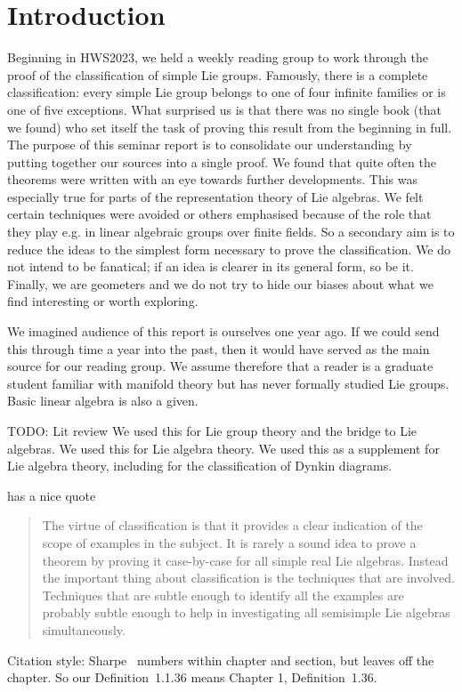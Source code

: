 \chapter{Introduction}

Beginning in HWS2023, we held a weekly reading group to work through the proof of the classification of simple Lie groups.
Famously, there is a complete classification: every simple Lie group belongs to one of four infinite families or is one of five exceptions.
What surprised us is that there was no single book (that we found) who set itself the task of proving this result from the beginning in full.
The purpose of this seminar report is to consolidate our understanding by putting together our sources into a single proof.
We found that quite often the theorems were written with an eye towards further developments.
This was especially true for parts of the representation theory of Lie algebras.
We felt certain techniques were avoided or others emphasised because of the role that they play e.g. in linear algebraic groups over finite fields.
So a secondary aim is to reduce the ideas to the simplest form necessary to prove the classification.
We do not intend to be fanatical; if an idea is clearer in its general form, so be it.
Finally, we are geometers and we do not try to hide our biases about what we find interesting or worth exploring.

We imagined audience of this report is ourselves one year ago.
If we could send this through time a year into the past, then it would have served as the main source for our reading group. 
We assume therefore that a reader is a graduate student familiar with manifold theory but has never formally studied Lie groups.
Basic linear algebra is also a given.

TODO: Lit review
\cite{Warner1983} We used this for Lie group theory and the bridge to Lie algebras.
\cite{Hall2015} We used this for Lie algebra theory.
\cite{Fulton2004} We used this as a supplement for Lie algebra theory, including for the classification of Dynkin diagrams.

\cite[p.~349]{Knapp1986} has a nice quote 
\begin{quotation}
The virtue of classification is that it provides a clear indication of
the scope of examples in the subject. It is rarely a sound idea to prove
a theorem by proving it case-by-case for all simple real Lie algebras.
Instead the important thing about classification is the techniques that are
involved. Techniques that are subtle enough to identify all the examples
are probably subtle enough to help in investigating all semisimple Lie
algebras simultaneously.
\end{quotation}


Citation style:
Sharpe~\cite{Sharpe1997} numbers within chapter and section, but leaves off the chapter. So our Definition~1.1.36 means Chapter 1, Definition~1.36.